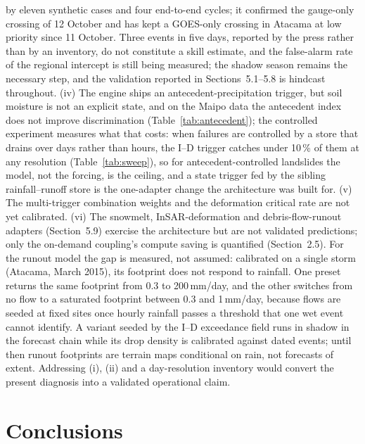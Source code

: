 \documentclass[authoryear,preprint,review,12pt]{elsarticle}
\begin{document}
by eleven synthetic cases and four end-to-end cycles; it confirmed the gauge-only
crossing of 12 October and has kept a GOES-only crossing in Atacama at low priority
since 11 October. Three events in five days, reported by the press rather than by an
inventory, do not constitute a skill estimate, and the false-alarm rate of the
regional intercept is still being measured; the shadow season remains the
necessary step, and the validation reported in Sections~5.1--5.8 is hindcast
throughout.
(iv) The engine ships an antecedent-precipitation trigger, but soil moisture is not an
explicit state, and on the Maipo data the antecedent index does not improve
discrimination (Table~\ref{tab:antecedent}); the controlled experiment measures what that costs: when failures are controlled by a store that drains over days rather than hours, the I--D trigger catches under 10\,\% of them at any resolution (Table~\ref{tab:sweep}), so for antecedent-controlled landslides the model, not the forcing, is the ceiling, and a state trigger fed by the sibling rainfall--runoff store is the one-adapter change the architecture was built for. (v) The multi-trigger combination weights and
the deformation critical rate are not yet calibrated. (vi) The snowmelt, InSAR-deformation
and debris-flow-runout adapters (Section~5.9) exercise the architecture but are not
validated predictions; only the on-demand coupling's compute saving is quantified
(Section~2.5). For the runout model the gap is measured, not assumed: calibrated on a
single storm (Atacama, March 2015), its footprint does not respond to rainfall. One
preset returns the same footprint from 0.3 to 200\,mm/day, and the other switches
from no flow to a saturated footprint between 0.3 and 1\,mm/day, because flows are
seeded at fixed sites once hourly rainfall passes a threshold that one wet event
cannot identify. A variant seeded by the I--D exceedance field runs in shadow in the
forecast chain while its drop density is calibrated against dated events; until then
runout footprints are terrain maps conditional on rain, not forecasts of extent.
Addressing (i), (ii) and a day-resolution inventory would convert the present
diagnosis into a validated operational claim.

\section{Conclusions}
\end{document}
